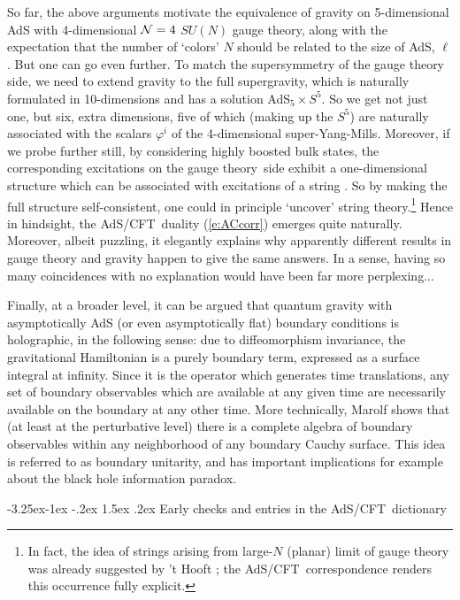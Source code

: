 \documentclass[12pt]{article}
\makeatletter
\renewcommand\subsection{\@startsection{subsection}{2}{\z@}%
                                     {-3.25ex\@plus -1ex \@minus -.2ex}%
                                     {1.5ex \@plus .2ex}%
                                     {\normalfont\bfseries}}
\def\req#1{(\ref{#1})}
\def\AC{AdS/CFT}
\def\GT{gauge theory}
\def\SYM{super-Yang-Mills}
\def\adss#1#2{AdS$_{#1} \times S^{#2}$}
\def\Rads{\ell}
\def\ph{\varphi}
\makeatother
\begin{document}
So far, the above arguments motivate the equivalence of gravity on 5-dimensional AdS with 4-dimensional  ${\cal N}=4$ $SU(N)$ gauge theory, along with the expectation that the number of `colors' $N$ should be related to the size of AdS, $\Rads$.  But one can go even further.   
To match the supersymmetry of the gauge theory side, we need to extend gravity to the full supergravity, which is naturally formulated in 10-dimensions and has a solution \adss55.  So we get not just one, but six, extra dimensions, five of which (making up the $S^5$) are naturally associated with the scalars $\ph^i$ of the 4-dimensional \SYM.
Moreover, if we probe further still, by considering highly boosted bulk states, the corresponding excitations on the \GT\ side exhibit a one-dimensional structure which  can be associated with excitations of a string \cite{Berenstein:2002jq}.
 So by making the full structure self-consistent, one could in principle `uncover' string theory.\footnote{
 In fact, the idea of strings arising from large-$N$ (planar) limit of gauge theory  was already suggested by 't Hooft \cite{tHooft:1973jz}; the \AC\ correspondence renders this occurrence fully explicit.
}  Hence in hindsight, the \AC\ duality \req{e:ACcorr} emerges quite naturally.
Moreover, albeit puzzling, it elegantly explains why apparently different results in gauge theory and gravity happen to give the same answers.  In a sense, having so many coincidences with no explanation would have been far more perplexing...

Finally, at a broader level, it can be argued \cite{Marolf:2008mf} that quantum gravity with asymptotically AdS (or even asymptotically flat) boundary conditions is holographic, in the following sense: due to diffeomorphism invariance, the gravitational Hamiltonian is a purely boundary term, expressed as a surface integral at infinity.  Since it is the operator which generates time translations, any set of boundary observables which are available at any given time are necessarily available on the boundary at any other time.  More technically, Marolf  \cite{Marolf:2008mf} shows that (at least at the perturbative level) there is a complete algebra of boundary observables within any neighborhood of any boundary Cauchy surface.
This idea is referred to as boundary unitarity, and has important implications for example about the black hole information paradox.

\subsection{Early checks and entries in the \AC\ dictionary}
\label{s:ACdictionary}
\end{document}
